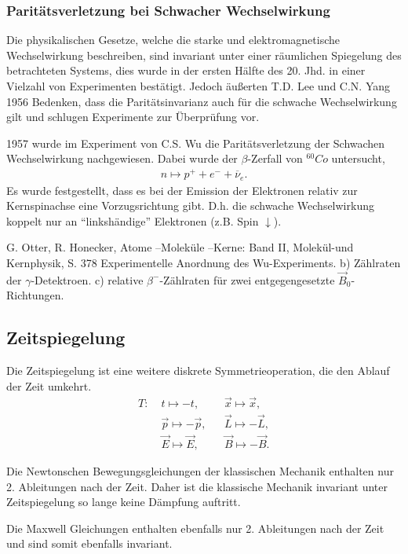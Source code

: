 \subsubsection{Paritätsverletzung bei Schwacher Wechselwirkung}
Die physikalischen Gesetze, welche die starke und elektromagnetische Wechselwirkung
 beschreiben, sind invariant unter einer räumlichen Spiegelung des betrachteten
  Systems, dies wurde in der ersten Hälfte des 20. Jhd. in einer Vielzahl von
  Experimenten bestätigt. Jedoch äußerten T.D. Lee und C.N. Yang 1956
  Bedenken, dass die Paritätsinvarianz auch
  für die schwache Wechselwirkung gilt und schlugen Experimente zur Überprüfung
  vor.

1957 wurde im Experiment von C.S. Wu die Paritätsverletzung der Schwachen
Wechselwirkung nachgewiesen. Dabei wurde der $\beta$-Zerfall von ${}^{60}Co$
untersucht,
\begin{align*}
n\mapsto p^+ + e^- + \overline{\nu}_e.
\end{align*}
Es wurde festgestellt, dass es bei der Emission der Elektronen relativ zur
Kernspinachse eine Vorzugsrichtung gibt. D.h. die schwache Wechselwirkung
koppelt nur an ``linkshändige'' Elektronen (z.B. Spin $\downarrow$).

%
	{G. Otter, R. Honecker, Atome –Moleküle –Kerne: Band II, Molekül-und Kernphysik, S. 378}%
	{Experimentelle Anordnung des Wu-Experiments. b) Zählraten der
	$\gamma$-Detektroen. c) relative $\beta^-$-Zählraten für zwei entgegengesetzte
 $\vec{B}_0$-Richtungen.}

\subsection{Zeitspiegelung}

Die Zeitspiegelung ist eine weitere diskrete Symmetrieoperation, die den
Ablauf der Zeit umkehrt.
\begin{align*}
T:\; & t\mapsto -t, && \vec{x}\mapsto \vec{x},\\
&\vec{p}\mapsto -\vec{p},&&\vec{L}\mapsto -\vec{L},\\
&\vec{E}\mapsto \vec{E},&&\vec{B}\mapsto -\vec{B}.
\end{align*}

Die Newtonschen Bewegungsgleichungen der klassischen Mechanik enthalten nur 2.
Ableitungen nach der Zeit. Daher ist die klassische Mechanik invariant unter
Zeitspiegelung so lange keine Dämpfung auftritt.

Die Maxwell Gleichungen enthalten ebenfalls nur 2. Ableitungen nach der Zeit
und sind somit ebenfalls invariant.

